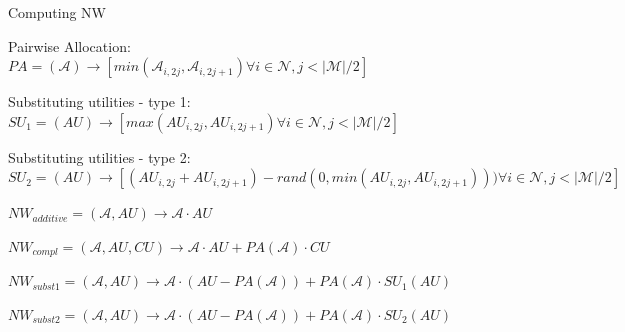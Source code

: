\begin{algorithm}
\caption{ Computing NW }
\SetAlgoLined

Pairwise Allocation: \\
$ PA = (\mathcal{A}) \rightarrow [min(\mathcal{A}_{i,2j}, \mathcal{A}_{i,2j+1}) \forall i \in \mathcal{N}, j < |\mathcal{M}|/2] $

\BlankLine

Substituting utilities - type 1: \\
$ SU_1 = (AU) \rightarrow [max(AU_{i,2j}, AU_{i,2j+1}) \forall i \in \mathcal{N}, j < |\mathcal{M}|/2] $

\BlankLine

Substituting utilities - type 2: \\
$ SU_2 = (AU) \rightarrow [(AU_{i,2j} + AU_{i,2j+1}) - rand(0, min(AU_{i,2j}, AU_{i,2j+1}))) \forall i \in \mathcal{N}, j < |\mathcal{M}|/2] $

\BlankLine
\BlankLine

$ NW_{additive} = (\mathcal{A}, AU) \rightarrow \mathcal{A} \cdot AU $

$ NW_{compl} = (\mathcal{A}, AU, CU) \rightarrow \mathcal{A} \cdot AU + PA(\mathcal{A}) \cdot CU $

$ NW_{subst1} = (\mathcal{A}, AU) \rightarrow \mathcal{A} \cdot (AU - PA(\mathcal{A})) + PA(\mathcal{A}) \cdot SU_1(AU) $

$ NW_{subst2} = (\mathcal{A}, AU) \rightarrow \mathcal{A} \cdot (AU - PA(\mathcal{A})) + PA(\mathcal{A}) \cdot SU_2(AU) $

\end{algorithm}


